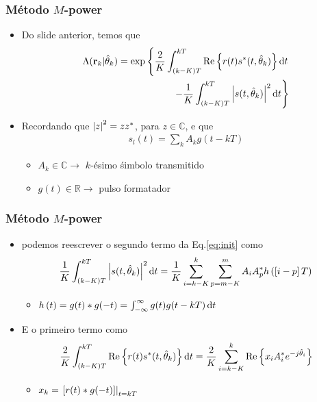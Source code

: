 \begin{frame}[t]
	\frametitle{Método \(M\)-power}
    \begin{itemize}
        \item Do slide anterior, temos que
        \begin{align}
            \Lambda(\mathbf{r}_k|\hat{\theta}_{k}) = \textnormal{exp} \left\{ \frac{2}{K}  \int_{(k-K)T}^{kT} \textnormal{Re}\left\{r(t)s^*(t, \hat{\theta}_{k})\right\} \diff{t} \right. \nonumber \\
            \left. - \frac{1}{K} \int_{(k-K)T}^{kT} \abs{s(t, \hat{\theta}_{k})}^{2} \diff{t} \right\}
            \label{eq:init}
        \end{align}
        \item Recordando que \(\left\lvert z\right\rvert^2 = z z^*\), para \(z \in \mathbb{C}\), e que
        \begin{align}
            s_l (t) = \sum_k A_k g(t - kT)
        \end{align}
        \begin{itemize}
            \item \(A_k \in \mathbb{C} \rightarrow\) \(k\)-ésimo śimbolo transmitido
            \item \(g(t) \in \mathbb{R} \rightarrow\) pulso formatador
        \end{itemize}
    \end{itemize}
\end{frame}

\begin{frame}[t]
	\frametitle{Método \(M\)-power}
    \begin{itemize}
        \item podemos reescrever o segundo termo da Eq.\eqref{eq:init} como
        \begin{align}
            \frac{1}{K} \int_{(k-K)T}^{kT} \abs{s(t, \hat{\theta}_{k})}^{2} \diff{t} = \frac{1}{K} \sum_{i = k-K}^{k} \sum_{p = m-K}^{m} A_i A_p^*h\left( \left[ i-p \right]T \right)
            \label{eq:seg-term1}
        \end{align}
        \begin{itemize}
            \item \(h\left( t \right) = g(t) * g(-t) = \int_{-\infty}^{\infty} g(t) g(t - kT) \diff{t}\)
        \end{itemize}
        \item E o primeiro termo como
        \begin{align}
            \frac{2}{K} \int_{(k-K)T}^{kT} \textnormal{Re}\left\{r(t)s^*(t, \hat{\theta}_{k})\right\} \diff{t} = \frac{2}{K} \sum_{i = k-K}^{k} \textnormal{Re} \left\{ x_i A_i^* e^{-j \hat{\theta}_{i}} \right\}
        \end{align}
        \begin{itemize}
            \item \(x_k = \left.\left[r(t) * g(-t)\right]\right|_{t=kT} \)
        \end{itemize}
    \end{itemize}
\end{frame}

